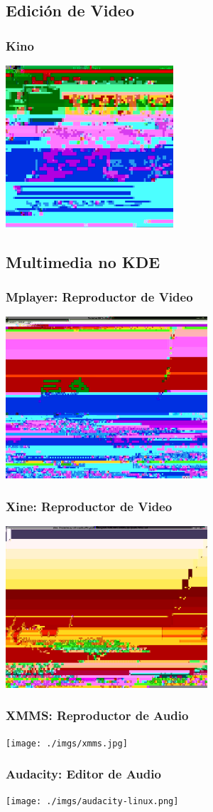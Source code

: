 \subsection{Edición de Video}
\frame
{
	\frametitle{Kino}
	\begin{center}
		\includegraphics[height=6cm]{./imgs/kino.jpg}
	\end{center}
}

\subsection{Multimedia no KDE}
\frame
{
	\frametitle{Mplayer: Reproductor de Video}
	\begin{center}
		\includegraphics[height=6cm]{./imgs/mplayer.jpg}
	\end{center}
}

\frame
{
	\frametitle{Xine: Reproductor de Video}
	\begin{center}
		\includegraphics[height=6cm]{./imgs/xine1.jpg}
	\end{center}
}

\frame
{	
	\frametitle{XMMS: Reproductor de Audio}
	\begin{center}
		\texttt{[image: ./imgs/xmms.jpg]}
	\end{center}
}

\frame
{
	\frametitle{Audacity: Editor de Audio}
	\begin{center}
		\texttt{[image: ./imgs/audacity-linux.png]}
	\end{center}
}

